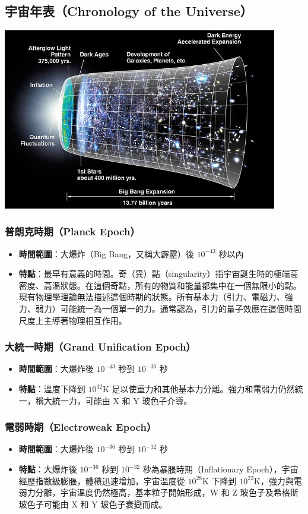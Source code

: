 \documentclass[a4paper,12pt]{report}
\begin{document}
\subsection{宇宙年表（Chronology of the Universe）}
\bctf\includegraphics[width=0.9\textwidth]{宇宙年表.jpg}\efct
\subsubsection{普朗克時期（Planck Epoch）}
\begin{itemize}
\item \textbf{時間範圍}：大爆炸（Big Bang，又稱大霹靂）後 \(10^{-43}\) 秒以內
\item \textbf{特點}：最早有意義的時間。奇（異）點（singularity）指宇宙誕生時的極端高密度、高溫狀態。在這個奇點，所有的物質和能量都集中在一個無限小的點。現有物理學理論無法描述這個時期的狀態。所有基本力（引力、電磁力、強力、弱力）可能統一為一個單一的力。通常認為，引力的量子效應在這個時間尺度上主導著物理相互作用。
\end{itemize}
\subsubsection{大統一時期（Grand Unification Epoch）}
\begin{itemize}
\item \textbf{時間範圍}：大爆炸後 \(10^{-43}\) 秒到 \(10^{-36}\) 秒
\item \textbf{特點}：溫度下降到 \(10^{32}\text{K}\) 足以使重力和其他基本力分離。強力和電弱力仍然統一，稱大統一力，可能由 X 和 Y 玻色子介導。
\end{itemize}
\subsubsection{電弱時期（Electroweak Epoch）}
\begin{itemize}
\item \textbf{時間範圍}：大爆炸後 \(10^{-36}\) 秒到 \(10^{-12}\) 秒
\item \textbf{特點}：大爆炸後 \(10^{-36}\) 秒到 \(10^{-32}\) 秒為暴脹時期（Inflationary Epoch），宇宙經歷指數級膨脹，體積迅速增加，宇宙溫度從 \(10^{28}\text{K}\) 下降到 \(10^{22}\text{K}\)，強力與電弱力分離，宇宙溫度仍然極高，基本粒子開始形成，W 和 Z 玻色子及希格斯玻色子可能由 X 和 Y 玻色子衰變而成。
\end{itemize}
\end{document}
